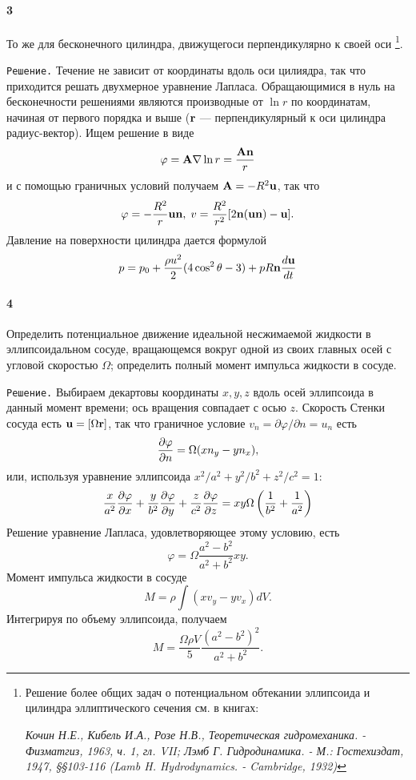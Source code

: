 \paragraph*{3}
То же для бесконечного цилиндра, движущегоси перпендикулярно к своей оси
\footnote{Решение более общих задач о потенциальном обтекании эллипсоида и цилиндра
эллиптического сечения см. в книгах:

\em{Кочин Н.Е., Кибель И.А., Розе Н.В.}, Теоретическая гидромеханика. - Физматгиз, 1963,
ч. 1, гл. VII; \em{Лэмб Г.} Гидродинамика. - М.: Гостехиздат, 1947, \S\S103-116
(\em{Lamb H.} Hydrodynamics. - Cambridge, 1932)}.

\texttt{Решение.} Течение не зависит от координаты вдоль оси цилиядра, так что
приходится решать двухмерное уравнение Лапласа. Обращающимися в нуль на
бесконечности решениями являются производные от $\ln r$ по координатам,
начиная от первого порядка и выше ($\mathbf{r}$ — перпендикулярный к оси цилиндра
радиус-вектор). Ищем решение в виде
\[
   \varphi = \mathbf{A} \nabla \ln r = \frac{\mathbf{An}}{r}
\]
и с помощью граничных условий получаем $\mathbf{A} = -R^2 \mathbf{u}$, так что
\[
   \varphi = - \frac{R^2}{r}\mathbf{un},\;
   v = \frac{R^2}{r^2}\lbrack 2 \mathbf{n(un)-u} \rbrack.
\]
Давление на поверхности цилиндра дается формулой
\[
   p = p_0 + \frac{\rho u^2}{2}(4\cos^2\theta - 3) + pR\mathbf{n}\frac{d{\mathbf{u}}}{d{t}}
\]

\paragraph*{4}

Определить потенциальное движение идеальной несжимаемой жидкости в
эллипсоидальном сосуде, вращающемся вокруг одной из своих главных осей с угловой
скоростью $\Omega$; определить полный момент импульса жидкости в сосуде.

\texttt{Решение.} Выбираем декартовы координаты $x,y,z$ вдоль осей эллипсоида в
данный момент времени; ось вращения совпадает с осью $z$. Скорость Стенки сосуда
есть $\mathbf{u} = \lbrack \Omega \mathbf{r} \rbrack$, так что граничное условие
$v_n=\partial\varphi/\partial n=u_n$ есть
\[
   \frac{\partial{\varphi}}{\partial{n}} = \Omega(xn_y-yn_x),
\]
или, используя уравнение эллипсоида $x^2/a^2+y^2/b^2+z^2/c^2=1$:
\[
   \frac{x}{a^2}\frac{\partial{\varphi}}{\partial{x}} +
   \frac{y}{b^2}\frac{\partial{\varphi}}{\partial{y}} +
   \frac{z}{c^2}\frac{\partial{\varphi}}{\partial{z}} =
   xy\Omega\left(\frac1{b^2}+\frac1{a^2}\right)
\]
Решение уравнение Лапласа, удовлетворяющее этому условию, есть
\begin{equation}
   \label{eq:10_tasks_1}
   \varphi = \Omega \frac{a^2-b^2}{a^2+b^2}xy.
\end{equation}
Момент импульса жидкости в сосуде
\[
   M = \rho \int (xv_y-yv_x)dV.
\]
Интегрируя по объему эллипсоида, получаем
\[
   M = \frac{\Omega \rho V}{5}\frac{(a^2-b^2)^2}{a^2+b^2}.
\]

